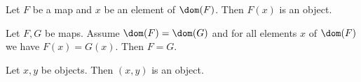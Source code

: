\begin{forthel}
  \begin{lemma}
    Let $F$ be a map and $x$ be an element of $\dom(F)$.
    Then $F(x)$ is an object.
  \end{lemma}

  \begin{lemma}
    Let $F, G$ be maps.
    Assume $\dom(F) = \dom(G)$ and for all elements $x$ of $\dom(F)$ we have
    $F(x) = G(x)$.
    Then $F = G$.
  \end{lemma}



  \begin{lemma}
    Let $x, y$ be objects.
    Then $(x,y)$ is an object.
  \end{lemma}
\end{forthel}
